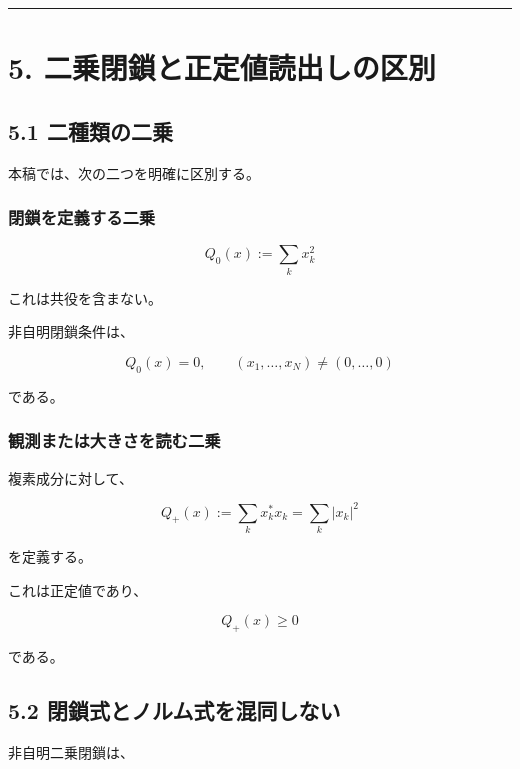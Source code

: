 \documentclass[
  a4paper,
  10pt]{article}
\begin{document}
\begin{center}\rule{0.5\linewidth}{0.5pt}\end{center}

\section{5.
二乗閉鎖と正定値読出しの区別}\label{5-ux4e8cux4e57ux9589ux9396ux3068ux6b63ux5b9aux5024ux8aadux51faux3057ux306eux533aux5225}

\subsection{5.1
二種類の二乗}\label{51-ux4e8cux7a2eux985eux306eux4e8cux4e57}

本稿では、次の二つを明確に区別する。

\subsubsection{閉鎖を定義する二乗}\label{ux9589ux9396ux3092ux5b9aux7fa9ux3059ux308bux4e8cux4e57}

\[
Q_0(x):=\sum_kx_k^2
\]

これは共役を含まない。

非自明閉鎖条件は、

\[
Q_0(x)=0,
\qquad (x_1,\ldots,x_N)\neq(0,\ldots,0)
\]

である。

\subsubsection{観測または大きさを読む二乗}\label{ux89b3ux6e2cux307eux305fux306fux5927ux304dux3055ux3092ux8aadux3080ux4e8cux4e57}

複素成分に対して、

\[
Q_+(x):=\sum_kx_k^*x_k
=\sum_k|x_k|^2
\]

を定義する。

これは正定値であり、

\[
Q_+(x)\ge0
\]

である。

\subsection{5.2
閉鎖式とノルム式を混同しない}\label{52-ux9589ux9396ux5f0fux3068ux30ceux30ebux30e0ux5f0fux3092ux6df7ux540cux3057ux306aux3044}

非自明二乗閉鎖は、
\end{document}
